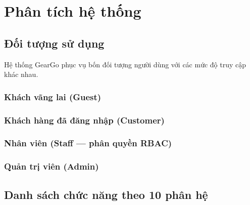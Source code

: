 \chapter{Phân tích hệ thống}
\label{chuong:phan_tich}

\section{Đối tượng sử dụng}
\label{sec:actors}

Hệ thống GearGo phục vụ bốn đối tượng người dùng với các mức độ truy cập khác nhau.

\subsection{Khách vãng lai (Guest)}

\subsection{Khách hàng đã đăng nhập (Customer)}

\subsection{Nhân viên (Staff --- phân quyền RBAC)}

\subsection{Quản trị viên (Admin)}

\section{Danh sách chức năng theo 10 phân hệ}
\label{sec:danh_sach_chuc_nang}

